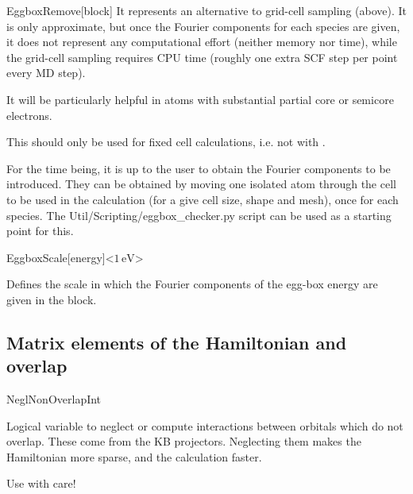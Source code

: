 \begin{fdfentry}{EggboxRemove}[block]
  It represents an alternative to grid-cell sampling (above).  It is
  only approximate, but once the Fourier components for each species
  are given, it does not represent any computational effort (neither
  memory nor time), while the grid-cell sampling requires CPU time
  (roughly one extra SCF step per point every MD step).

  It will be particularly helpful in atoms with substantial partial
  core or semicore electrons.

  \note This should only be used for fixed cell calculations, i.e. not
  with .

  For the time being, it is up to the user to obtain the Fourier
  components to be introduced. They can be obtained by moving one
  isolated atom through the cell to be used in the calculation (for a
  give cell size, shape and mesh), once for each species.  The
  Util/Scripting/eggbox\_checker.py script can be used as a starting
  point for this.

\end{fdfentry}

\begin{fdfentry}{EggboxScale}[energy]<$1\,\mathrm{eV}$>

  Defines the scale in which the Fourier components of the egg-box
  energy are given in the  block.

\end{fdfentry}

\subsection{Matrix elements of the Hamiltonian and overlap}


\begin{fdflogicalF}{NeglNonOverlapInt}
  
  Logical variable to neglect or compute interactions between orbitals
  which do not overlap. These come from the KB projectors.  Neglecting
  them makes the Hamiltonian more sparse, and the calculation faster.
  
  \note Use with care!

\end{fdflogicalF}

